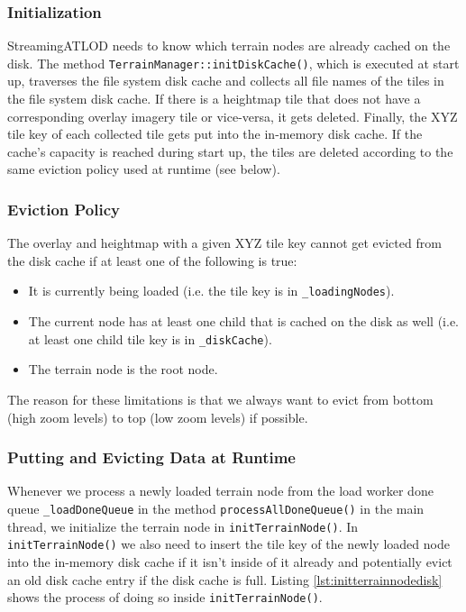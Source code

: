 \subsubsection{Initialization}
StreamingATLOD needs to know which terrain nodes are already 
cached on the disk.
The method \texttt{TerrainManager::initDiskCache()}, which is executed at start up,
traverses the file system disk cache and collects all file names of the 
tiles in the file system disk cache. 
If there is a heightmap tile that does not have a corresponding 
overlay imagery tile or vice-versa, it gets deleted.
Finally, the XYZ tile key of each collected tile gets 
put into the in-memory disk cache. If the cache's 
capacity is reached during start up, 
the tiles are deleted according to the same eviction policy
used at runtime (see below). 

\subsubsection{Eviction Policy}
The overlay and heightmap with a given XYZ tile key
cannot get evicted from the disk cache if at least one of the following
is true:
\begin{itemize}
  \item It is currently being loaded (i.e. the tile key is in \texttt{\_loadingNodes}).
  \item The current node has at least one child that is cached on the disk as well (i.e. 
  at least one child tile key is in \texttt{\_diskCache}).
  \item The terrain node is the root node.
\end{itemize}
The reason for these limitations is that we always want to evict 
from bottom (high zoom levels) to top (low zoom levels) if possible.

\subsubsection{Putting and Evicting Data at Runtime}
Whenever we process a newly loaded terrain node from the 
load worker done queue \texttt{\_loadDoneQueue} in the method 
\texttt{processAllDoneQueue()} in the main thread, we initialize 
the terrain node in \texttt{initTerrainNode()}.
In \texttt{initTerrainNode()} we also need to insert the tile key of the newly loaded node 
into the in-memory disk cache if it isn't inside of it already and potentially 
evict an old disk cache entry if the disk cache is full.
Listing \ref{lst:initterrainnodedisk} shows the process of doing so 
inside \texttt{initTerrainNode()}.

